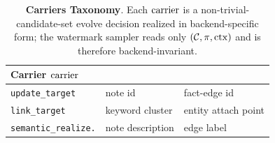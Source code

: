 \begin{table}[t]
\centering
\small
\setlength{\tabcolsep}{0.2mm}
\begin{tabular}{lll}
\toprule
Carrier $\mathrm{carrier}$ & \amem{} & \graphiti{}  \\
\midrule
\texttt{update\_target}
  & note id 
  & fact-edge id \\
\texttt{link\_target}
  & keyword cluster 
  & entity attach point \\
\texttt{semantic\_realize.}
  & note description 
  & edge label  \\
\bottomrule
\end{tabular}
\caption{\textbf{Carriers Taxonomy}. Each $\mathrm{carrier}$ is a
non-trivial-candidate-set evolve decision realized in
backend-specific form; the watermark sampler reads only
$(\mathcal{C}, \pi, \mathrm{ctx})$ and is therefore backend-invariant.}
\label{tab:carrier-taxonomy}
\end{table}
